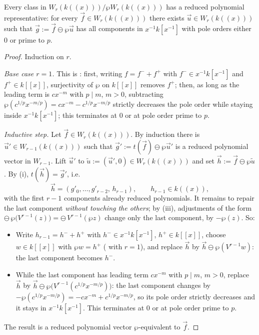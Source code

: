 \begin{prop}\label{prop:reduced_polynomial_representatives}
    Every class in $W_r(k((x)))/\wp W_r(k((x)))$ has a reduced polynomial
    representative: for every $\vec f \in W_r(k((x)))$ there exists
    $\vec u \in W_r(k((x)))$ such that $\vec g := \vec f \ominus \wp \vec u$ has all
    components in $x^{-1}k[x^{-1}]$ with pole orders either $0$ or prime to $p$.
\end{prop}

\begin{proof}
    Induction on $r$.

    \emph{Base case $r=1$.} This is :
    first, writing $f = f^- + f^+$ with
    $f^- \in x^{-1}k[x^{-1}]$ and $f^+ \in k[[x]]$, surjectivity of $\wp$ on $k[[x]]$
    removes $f^+$; then, as long as the leading term is $cx^{-m}$ with $p \mid m$,
    $m>0$, subtracting $\wp(c^{1/p}x^{-m/p}) = cx^{-m} - c^{1/p}x^{-m/p}$ strictly
    decreases the pole order while staying inside $x^{-1}k[x^{-1}]$; this terminates
    at $0$ or at pole order prime to $p$.

    \emph{Inductive step.} Let $\vec f \in W_r(k((x)))$. By induction there is
    $\vec u' \in W_{r-1}(k((x)))$ such that
    $\vec g' := t(\vec f) \ominus \wp \vec u'$ is a reduced polynomial vector in
    $W_{r-1}$. Lift $\vec u'$ to $\tilde u := (\vec u', 0) \in W_r(k((x)))$ and set
    $\vec h := \vec f \ominus \wp \tilde u$. By (i),
    $t(\vec h) = \vec g'$, i.e.\
    \[
    \vec h = (g'_0, \dots, g'_{r-2},\, h_{r-1}), \qquad h_{r-1} \in k((x)),
    \]
    with the first $r-1$ components already reduced polynomials. It remains to repair
    the last component \emph{without touching the others}; by
    (iii), adjustments of the form
    $\ominus\, \wp\bigl(V^{r-1}(z)\bigr) = \ominus\, V^{r-1}(\wp z)$ change only the
    last component, by $-\wp(z)$. So:
    \begin{itemize}
        \item Write $h_{r-1} = h^- + h^+$ with $h^- \in x^{-1}k[x^{-1}]$,
        $h^+ \in k[[x]]$, choose $w \in k[[x]]$ with $\wp w = h^+$
        (\Cref{lemma:wp_surjective_on_integral_witt} with $r=1$), and replace
        $\vec h$ by $\vec h \ominus \wp(V^{r-1}w)$: the last component becomes $h^-$.
        \item While the last component has leading term $cx^{-m}$ with $p \mid m$,
        $m>0$, replace $\vec h$ by
        $\vec h \ominus \wp\bigl(V^{r-1}(c^{1/p}x^{-m/p})\bigr)$: the last component
        changes by $-\wp(c^{1/p}x^{-m/p}) = -cx^{-m} + c^{1/p}x^{-m/p}$, so its pole
        order strictly decreases and it stays in $x^{-1}k[x^{-1}]$. This terminates at
        $0$ or at pole order prime to $p$.
    \end{itemize}
    The result is a reduced polynomial vector $\wp$-equivalent to $\vec f$.
\end{proof}

